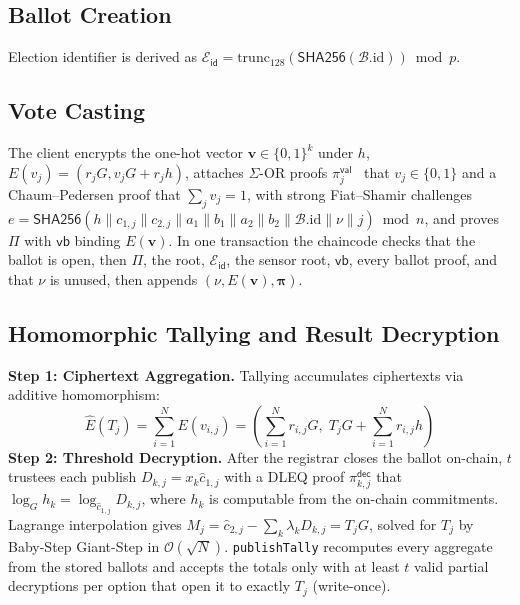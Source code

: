 \documentclass[10pt,letterpaper,journal]{IEEEtran}
\begin{document}
\subsection{Ballot Creation}
Election identifier is derived as $\mathcal{E}_{\mathsf{id}} = \text{trunc}_{128}(\mathsf{SHA256}(\mathcal{B}.\text{id})) \bmod p$.

\subsection{Vote Casting}
The client encrypts the one-hot vector $\mathbf{v} \in \{0,1\}^k$ under $h$, $E(v_j) = (r_j G, v_j G + r_j h)$, attaches $\Sigma$-OR proofs $\pi_j^{\mathsf{val}}$~\cite{ChaumPedersen1992} that $v_j \in \{0,1\}$ and a Chaum--Pedersen proof that $\sum_j v_j = 1$, with strong Fiat--Shamir challenges $e = \mathsf{SHA256}(h \parallel c_{1,j} \parallel c_{2,j} \parallel a_1 \parallel b_1 \parallel a_2 \parallel b_2 \parallel \mathcal{B}.\text{id} \parallel \nu \parallel j) \bmod n$, and proves $\Pi$ with $\mathsf{vb}$ binding $E(\mathbf{v})$. In one transaction the chaincode checks that the ballot is open, then $\Pi$, the root, $\mathcal{E}_{\mathsf{id}}$, the sensor root, $\mathsf{vb}$, every ballot proof, and that $\nu$ is unused, then appends $(\nu, E(\mathbf{v}), \boldsymbol{\pi})$.

\subsection{Homomorphic Tallying and Result Decryption}
\textbf{Step 1: Ciphertext Aggregation.} Tallying accumulates ciphertexts via additive homomorphism:
\begin{equation}
  \hat{E}(T_j) = \sum_{i=1}^{N} E(v_{i,j}) = \left( \sum_{i=1}^{N} r_{i,j} G, \; T_j G + \sum_{i=1}^{N} r_{i,j} h \right)
\end{equation}
\textbf{Step 2: Threshold Decryption.} After the registrar closes the ballot on-chain, $t$ trustees each publish $D_{k,j} = x_k \hat{c}_{1,j}$ with a DLEQ proof $\pi_{k,j}^{\mathsf{dec}}$ that $\log_G h_k = \log_{\hat{c}_{1,j}} D_{k,j}$, where $h_k$ is computable from the on-chain commitments. Lagrange interpolation gives $M_j = \hat{c}_{2,j} - \sum_k \lambda_k D_{k,j} = T_j G$, solved for $T_j$ by Baby-Step Giant-Step in $\mathcal{O}(\sqrt{N})$. \texttt{publishTally} recomputes every aggregate from the stored ballots and accepts the totals only with at least $t$ valid partial decryptions per option that open it to exactly $T_j$ (write-once).
\end{document}
